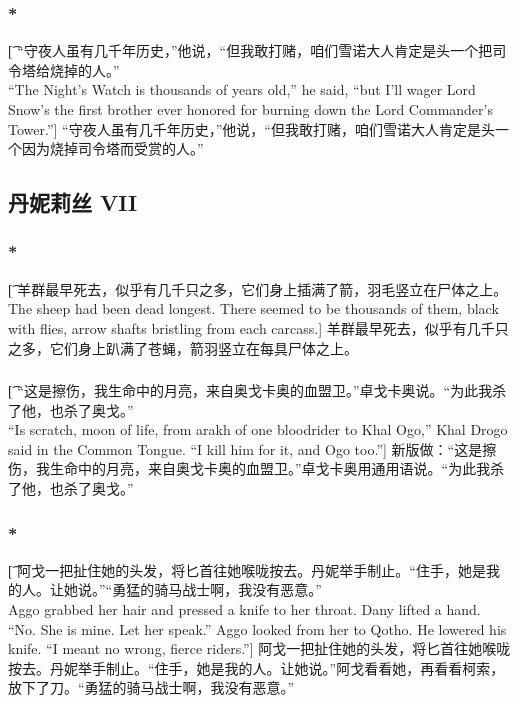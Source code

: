 \documentclass[12pt,a4paper]{article}
\begin{document}
\subsubsection{\color{red}*}\t[
	“守夜人虽有几千年历史，”他说，“但我敢打赌，咱们雪诺大人肯定是头一个把司令塔给烧掉的人。”\\
	“The Night's Watch is thousands of years old,” he said, “but I'll wager Lord Snow's the first brother ever honored for burning down the Lord Commander's Tower.”]
	“守夜人虽有几千年历史，”他说，“但我敢打赌，咱们雪诺大人肯定是头一个因为烧掉司令塔而受赏的人。”
	
	
\subsection{丹妮莉丝 VII}
\subsubsection{\color{red}*}\t[
	羊群最早死去，似乎有几千只之多，它们身上插满了箭，羽毛竖立在尸体之上。\\
	The sheep had been dead longest. There seemed to be thousands of them, black with flies, arrow shafts bristling from each carcass.]
	羊群最早死去，似乎有几千只之多，它们身上趴满了苍蝇，箭羽竖立在每具尸体之上。
	
\subsubsection{}\t[
	“这是擦伤，我生命中的月亮，来自奥戈卡奥的血盟卫。”卓戈卡奥说。“为此我杀了他，也杀了奥戈。”\\
	“Is scratch, moon of life, from arakh of one bloodrider to Khal Ogo,” Khal Drogo said in the Common Tongue. “I kill him for it, and Ogo too.”]
	新版做：“这是擦伤，我生命中的月亮，来自奥戈卡奥的血盟卫。”卓戈卡奥用通用语说。“为此我杀了他，也杀了奥戈。”
	
\subsubsection{\color{red}*}\t[
	阿戈一把扯住她的头发，将匕首往她喉咙按去。丹妮举手制止。“住手，她是我的人。让她说。”“勇猛的骑马战士啊，我没有恶意。”\\
	Aggo grabbed her hair and pressed a knife to her throat. Dany lifted a hand. “No. She is mine. Let her speak.” Aggo looked from her to Qotho. He lowered his knife. “I meant no wrong, fierce riders.”]
	阿戈一把扯住她的头发，将匕首往她喉咙按去。丹妮举手制止。“住手，她是我的人。让她说。”阿戈看看她，再看看柯索，放下了刀。“勇猛的骑马战士啊，我没有恶意。”
	
\end{document}
